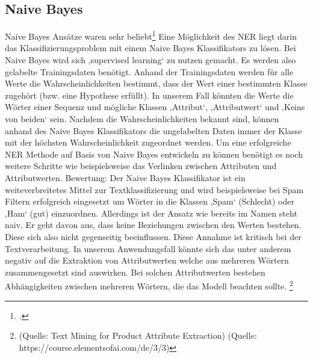 \documentclass[paper=a4,12pt,listof=totoc]{scrartcl}%
\begin{document}
	\subsection{Naive Bayes}
	Naive Bayes Ansätze waren sehr beliebt\footcite{Ghani.2006}
	Eine Möglichkeit des NER liegt darin das Klassifizierungsproblem mit einem Naive Bayes Klassifikators zu lösen. Bei Naive Bayes wird sich ‚supervised learning‘ zu nutzen gemacht. Es werden also gelabelte Trainingsdaten benötigt. Anhand der Trainingsdaten werden für alle Werte die Wahrscheinlichkeiten bestimmt, dass der Wert einer bestimmten Klasse zugehört (bzw. eine Hypothese erfüllt). In unserem Fall könnten die Werte die Wörter einer Sequenz und mögliche Klassen ‚Attribut‘, ‚Attributwert‘ und ‚Keins von beiden‘ sein. Nachdem die Wahrscheinlichkeiten bekannt sind, können anhand des Naive Bayes Klassifikators die ungelabelten Daten immer der Klasse mit der höchsten Wahrscheinlichkeit zugeordnet werden. Um eine erfolgreiche NER Methode auf Basis von Naive Bayes entwickeln zu können benötigt es noch weitere Schritte wie beispielsweise das Verlinken zwischen Attributen und Attributwerten. 
	Bewertung: Der Naive Bayes Klassifikator ist ein weiteverbreitetes Mittel zur Textklassifizierung und wird beispielsweise bei Spam Filtern erfolgreich eingesetzt um Wörter in die Klassen ‚Spam‘ (Schlecht) oder ‚Ham‘ (gut) einzuordnen. Allerdings ist der Ansatz wie bereits im Namen steht naiv. Er geht davon aus, dass keine Beziehungen zwischen den Werten bestehen. Diese sich also nicht gegenseitig beeinflussen. Diese Annahme ist kritisch bei der Textverarbeitung. In unserem Anwendungsfall könnte sich das unter anderem negativ auf die Extraktion von Attributwerten welche aus mehreren Wörtern zusammengesetzt sind auswirken. Bei solchen Attributwerten bestehen Abhängigkeiten zwischen mehreren Wörtern, die das Modell beachten sollte.
	\footnote{(Quelle: Text Mining for Product Attribute Extraction)
	(Quelle: https://course.elementsofai.com/de/3/3)}
\end{document}
